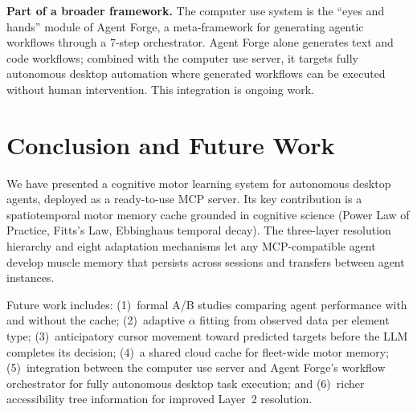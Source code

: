 \documentclass[conference]{IEEEtran}
\begin{document}
\textbf{Part of a broader framework.} The computer use system is the ``eyes and hands'' module of Agent Forge, a meta-framework for generating agentic workflows through a 7-step orchestrator. Agent Forge alone generates text and code workflows; combined with the computer use server, it targets fully autonomous desktop automation where generated workflows can be executed without human intervention. This integration is ongoing work.

\section{Conclusion and Future Work}

We have presented a cognitive motor learning system for autonomous desktop agents, deployed as a ready-to-use MCP server. Its key contribution is a spatiotemporal motor memory cache grounded in cognitive science (Power Law of Practice, Fitts's Law, Ebbinghaus temporal decay). The three-layer resolution hierarchy and eight adaptation mechanisms let any MCP-compatible agent develop muscle memory that persists across sessions and transfers between agent instances.

Future work includes: (1)~formal A/B studies comparing agent performance with and without the cache; (2)~adaptive $\alpha$ fitting from observed data per element type; (3)~anticipatory cursor movement toward predicted targets before the LLM completes its decision; (4)~a shared cloud cache for fleet-wide motor memory; (5)~integration between the computer use server and Agent Forge's workflow orchestrator for fully autonomous desktop task execution; and (6)~richer accessibility tree information for improved Layer~2 resolution.



\end{document}
